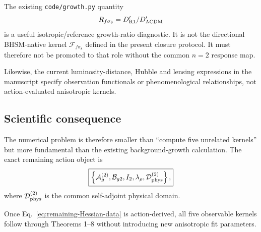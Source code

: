 The existing \texttt{code/growth.py} quantity
\begin{equation}
R_{f\sigma_8}
=
D'_{\rm R1}/D'_{\Lambda{\rm CDM}}
\end{equation}
is a useful isotropic/reference growth-ratio diagnostic.  It is not the
directional BHSM-native kernel $\mathcal F_{f\sigma_8}$ defined in the present
closure protocol.  It must therefore not be promoted to that role without
the common $n=2$ response map.

Likewise, the current luminosity-distance, Hubble and lensing expressions in
the manuscript specify observation functionals or phenomenological
relationships, not action-evaluated anisotropic kernels.

\subsection{Scientific consequence}

The numerical problem is therefore smaller than ``compute five unrelated
kernels'' but more fundamental than the existing background-growth
calculation.  The exact remaining action object is
\begin{equation}
\boxed{
\left\{
\mathcal A_g^{(2)},
\mathcal B_{g2},
I_2,
\lambda_\rho,
\mathcal D_{\rm phys}^{(2)}
\right\},
}
\label{eq:remaining-Hessian-data}
\end{equation}
where $\mathcal D_{\rm phys}^{(2)}$ is the common self-adjoint physical
domain.

Once Eq.~\eqref{eq:remaining-Hessian-data} is action-derived, all five
observable kernels follow through Theorems 1--8 without introducing new
anisotropic fit parameters.
